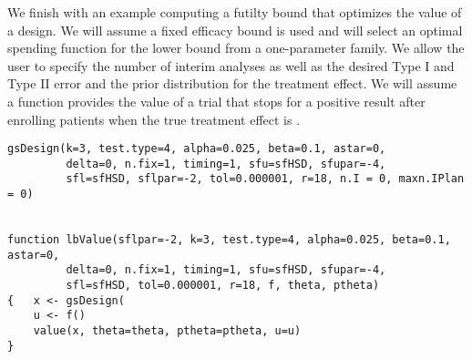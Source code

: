 We finish with an example computing a futilty bound that optimizes the value of a design.
We will assume a fixed efficacy bound is used and will select an optimal spending function for the lower bound from a one-parameter family. 
We allow the user to specify the number of interim analyses as well as the desired Type I and Type II error and the prior distribution for the treatment effect.
We will assume a function  provides the value of a trial that stops for a positive result after enrolling  patients when the true treatment effect is . 
\begin{verbatim}
gsDesign(k=3, test.type=4, alpha=0.025, beta=0.1, astar=0,  
         delta=0, n.fix=1, timing=1, sfu=sfHSD, sfupar=-4,
         sfl=sfHSD, sflpar=-2, tol=0.000001, r=18, n.I = 0, maxn.IPlan = 0) 


function lbValue(sflpar=-2, k=3, test.type=4, alpha=0.025, beta=0.1, astar=0,  
         delta=0, n.fix=1, timing=1, sfu=sfHSD, sfupar=-4,
         sfl=sfHSD, tol=0.000001, r=18, f, theta, ptheta)
{   x <- gsDesign(
    u <- f()
    value(x, theta=theta, ptheta=ptheta, u=u)
}
\end{verbatim}
